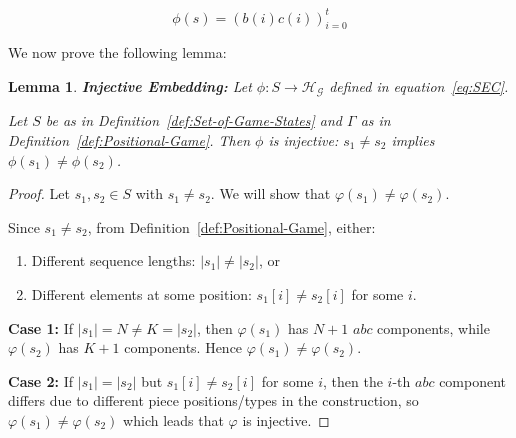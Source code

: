 \documentclass[11pt,a4paper]{article}
\theoremstyle{plain}
\newtheorem{lemma}[theorem]{Lemma}
\theoremstyle{definition}
\begin{document}
\vspace{0.5em}

\begin{equation}
\phi(s) = (b(i)c(i))_{i=0}^t
\label{eq:SEC}
\end{equation}

\vspace{0.5em}

We now prove the following lemma:

\vspace{0.5em}


\vspace{0.5em}
\begin{lemma}\textbf{Injective Embedding:}
\label{lem:injective-embedding}
Let $\phi: S \to \mathcal{H}_\mathcal{G}$ defined in equation~\ref{eq:SEC}.

\vspace{0.5em}

Let $S$ be as in Definition~\ref{def:Set-of-Game-States} and $\Gamma$ as in  Definition~\ref{def:Positional-Game}. Then $\phi$ is injective: $s_1 \ne s_2$ implies $\phi(s_1) \ne \phi(s_2)$.
\label{lem:Injective-Embedding}
\end{lemma}

\vspace{0.5em}

\begin{proof}
Let $s_{1}, s_{2} \in S$ with $s_{1} \neq s_{2}$. We will show that $\varphi(s_{1}) \neq \varphi(s_{2})$.

\vspace{0.5em}

Since $s_{1} \neq s_{2}$, from Definition~\ref{def:Positional-Game}, either:
\begin{enumerate}
    \item Different sequence lengths: $|s_{1}| \neq |s_{2}|$, or
    \item Different elements at some position: $s_{1}[i] \neq s_{2}[i]$ for some $i$.
\end{enumerate}

\vspace{0.5em}

\textbf{Case 1:} If $|s_{1}| = N \neq K = |s_{2}|$, then $\varphi(s_{1})$ has $N+1$ $abc$ components,  
while $\varphi(s_{2})$ has $K+1$ components. Hence $\varphi(s_{1}) \neq \varphi(s_{2})$.

\vspace{0.5em}

\textbf{Case 2:} If $|s_{1}| = |s_{2}|$ but $s_{1}[i] \neq s_{2}[i]$ for some $i$, then the $i$-th  
$abc$ component differs due to different piece positions/types in the construction, so  
$\varphi(s_{1}) \neq \varphi(s_{2})$ which leads that $\varphi$ is injective.
\end{proof}
\end{document}
